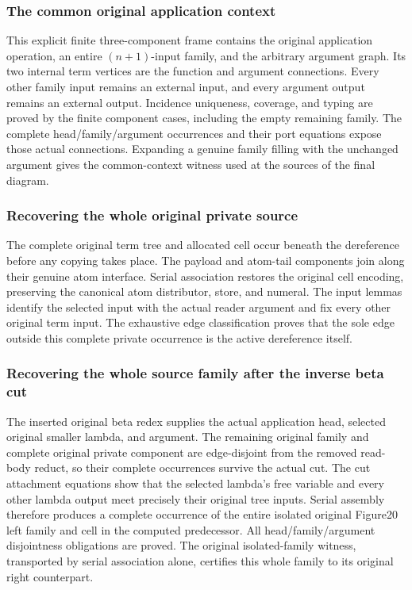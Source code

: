 \subsubsection{The common original application context}
This explicit finite three-component frame contains the original application operation, an entire $(n+1)$-input family, and the arbitrary argument graph.  Its two internal term vertices are the function and argument connections.  Every other family input remains an external input, and every argument output remains an external output.  Incidence uniqueness, coverage, and typing are proved by the finite component cases, including the empty remaining family.  The complete head/family/argument occurrences and their port equations expose those actual connections.  Expanding a genuine family filling with the unchanged argument gives the common-context witness used at the sources of the final diagram.

\subsubsection{Recovering the whole original private source}
The complete original term tree and allocated cell occur beneath the dereference before any copying takes place.  The payload and atom-tail components join along their genuine atom interface.  Serial association restores the original cell encoding, preserving the canonical atom distributor, store, and numeral.  The input lemmas identify the selected input with the actual reader argument and fix every other original term input.  The exhaustive edge classification proves that the sole edge outside this complete private occurrence is the active dereference itself.

\subsubsection{Recovering the whole source family after the inverse beta cut}
The inserted original beta redex supplies the actual application head, selected original smaller lambda, and argument.  The remaining original family and complete original private component are edge-disjoint from the removed read-body reduct, so their complete occurrences survive the actual cut.  The cut attachment equations show that the selected lambda's free variable and every other lambda output meet precisely their original tree inputs.  Serial assembly therefore produces a complete occurrence of the entire isolated original Figure20 left family and cell in the computed predecessor.  All head/family/argument disjointness obligations are proved.  The original isolated-family witness, transported by serial association alone, certifies this whole family to its original right counterpart.

